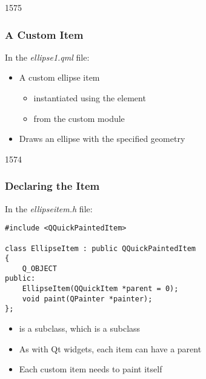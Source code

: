 \begin{slide}[fragile]{1575}\frametitle{A Custom Item}

In the \textit{ellipse1.qml} file:

\vspace*{0.5em}

\vspace*{0.5em}
\begin{itemize}
\item A custom ellipse item
  \begin{itemize}
  \item instantiated using the  element
  \item from the custom  module
  \end{itemize}
\item Draws an ellipse with the specified geometry
\end{itemize}

\end{slide}

\begin{slide}[fragile]{1574}\frametitle{Declaring the Item}

In the \textit{ellipseitem.h} file:

\medskip
\begin{lstlisting}
#include <QQuickPaintedItem>

class EllipseItem : public QQuickPaintedItem
{
    Q_OBJECT
public:
    EllipseItem(QQuickItem *parent = 0);
    void paint(QPainter *painter);
};
\end{lstlisting}

\begin{itemize}
\item {} is a  subclass, which is a  subclass
\item As with Qt widgets, each item can have a parent
\item Each custom item needs to paint itself
\end{itemize}

\end{slide}


